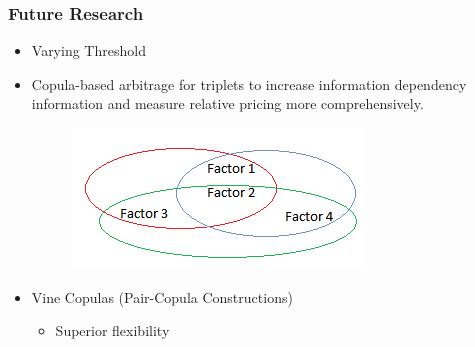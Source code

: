 \documentclass[pdf,9pt,xcolor=dvipsnames,hide notes]{beamer}
\begin{document}
\begin{frame}
	\frametitle{Future Research}
	
\begin{itemize}
	\item Varying Threshold
	
	\vspace{0.3cm}
	
	\item Copula-based arbitrage for triplets to increase information dependency information and measure relative pricing more comprehensively.
	
	
		\begin{figure}[htbp]
		\centering
		\includegraphics[scale=0.6]{fig4.png}
		\label{fig:fig4}
	\end{figure}

	\item Vine Copulas (Pair-Copula Constructions)
	
	\begin{itemize}
		\item Superior flexibility
	\end{itemize}
	
\end{itemize}
	
\end{frame}
\end{document}
